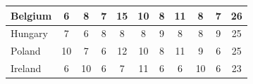 \documentclass[12pt]{article}  %
\begin{document}
\begin{subappendices}
\begin{longtable}{|l|c|c|c|c|c|c|c|c|c|c|}
	\hline
	Belgium                                                        & 6                                                                      & 8                                                                      & 7                                                                      & 15                                                                     & 10                                                                     & 8                                                                      & 11                        & 8                           & 7                           & 26                          \\ 
	\hline
	Hungary                                                        & 7                                                                      & 6                                                                      & 8                                                                      & 8                                                                      & 8                                                                      & 9                                                                      & 8                         & 8                           & 9                           & 25                          \\ 
	\hline
	Poland                                                         & 10                                                                     & 7                                                                      & 6                                                                      & 12                                                                     & 10                                                                     & 8                                                                      & 11                        & 9                           & 6                           & 25                          \\ 
	\hline
	Ireland                                                        & 6                                                                      & 10                                                                     & 6                                                                      & 7                                                                      & 11                                                                     & 6                                                                      & 6                         & 10                          & 6                           & 23                          \\ 

\end{longtable}
\end{subappendices}
\end{document}
